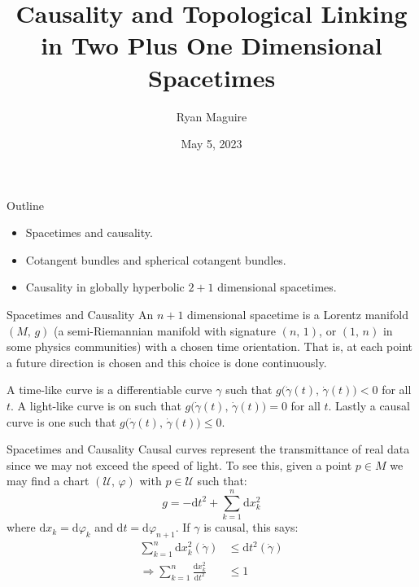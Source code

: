 \documentclass{beamer}
\title{Causality and Topological Linking in Two Plus One Dimensional Spacetimes}
\author{Ryan Maguire}
\date{May 5, 2023}
\begin{document}
    \maketitle
    \begin{frame}{Outline}
        \begin{itemize}
            \item Spacetimes and causality.
            \item Cotangent bundles and spherical cotangent bundles.
            \item Causality in globally hyperbolic $2+1$ dimensional spacetimes.
        \end{itemize}
    \end{frame}
    \begin{frame}{Spacetimes and Causality}
        An $n+1$ dimensional spacetime is a Lorentz manifold $(M,\,g)$
        (a semi-Riemannian manifold with signature $(n,\,1)$, or $(1,\,n)$ in
        some physics communities) with a chosen time orientation. That is, at
        each point a future direction is chosen and this choice is done
        continuously.
        \par\hfill\par
        A time-like curve is a differentiable curve $\gamma$ such that
        $g\big(\dot{\gamma}(t),\,\dot{\gamma}(t)\big)<0$ for all $t$. A
        light-like curve is on such that
        $g\big(\dot{\gamma}(t),\,\dot{\gamma}(t)\big)=0$ for all $t$. Lastly a
        causal curve is one such that
        $g\big(\dot{\gamma}(t),\,\dot{\gamma}(t)\big)\leq{0}$.
    \end{frame}
    \begin{frame}{Spacetimes and Causality}
        Causal curves represent the transmittance of real data since we may not
        exceed the speed of light. To see this, given a point $p\in{M}$ we may
        find a chart $(\mathcal{U},\,\varphi)$ with $p\in\mathcal{U}$ such that:
        \begin{equation}
            g=-\textrm{d}t^{2}+\sum_{k=1}^{n}\textrm{d}x_{k}^{2}
        \end{equation}
        where $\textrm{d}x_{k}=\textrm{d}\varphi_{k}$ and
        $\textrm{d}t=\textrm{d}\varphi_{n+1}$. If $\gamma$ is causal, this says:
        \begin{align}
            \sum_{k=1}^{n}\textrm{d}x_{k}^{2}(\dot{\gamma})
                &\leq\textrm{d}t^{2}(\dot{\gamma})\\
            \Rightarrow
            \sum_{k=1}^{n}\frac{\textrm{d}x_{k}^{2}}{\textrm{d}t^{2}}&\leq{1}
        \end{align}
    \end{frame}
\end{document}
